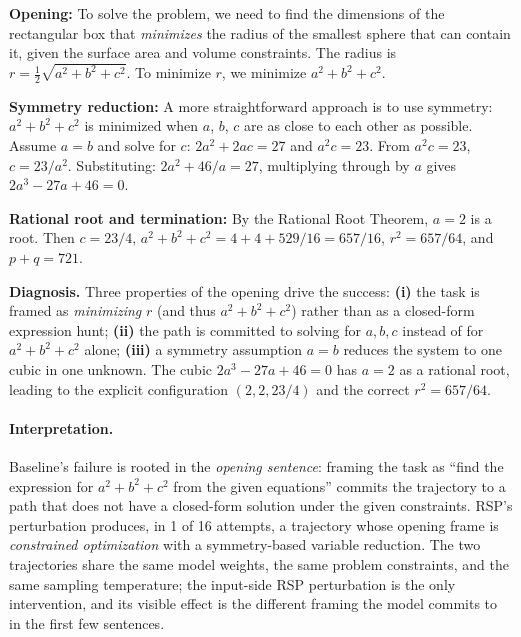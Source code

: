 \begin{tcolorbox}[colback=gray!5, colframe=black!60, arc=3pt, boxrule=0.5pt, fontupper=\footnotesize, breakable, title={RSP trajectory (final answer 721) --- excerpts}]
\textbf{Opening:} To solve the problem, we need to find the dimensions of the rectangular box that \emph{minimizes} the radius of the smallest sphere that can contain it, given the surface area and volume constraints. The radius is $r = \tfrac{1}{2}\sqrt{a^2 + b^2 + c^2}$. To minimize $r$, we minimize $a^2 + b^2 + c^2$.

\textbf{Symmetry reduction:} A more straightforward approach is to use symmetry: $a^2 + b^2 + c^2$ is minimized when $a$, $b$, $c$ are as close to each other as possible. Assume $a = b$ and solve for $c$: $2a^2 + 2ac = 27$ and $a^2 c = 23$. From $a^2 c = 23$, $c = 23/a^2$. Substituting: $2a^2 + 46/a = 27$, multiplying through by $a$ gives $2a^3 - 27a + 46 = 0$.

\textbf{Rational root and termination:} By the Rational Root Theorem, $a = 2$ is a root. Then $c = 23/4$, $a^2 + b^2 + c^2 = 4 + 4 + 529/16 = 657/16$, $r^2 = 657/64$, and $p + q = \boxed{721}$.
\end{tcolorbox}

\textbf{Diagnosis.} Three properties of the opening drive the success: \textbf{(i)} the task is framed as \emph{minimizing} $r$ (and thus $a^2+b^2+c^2$) rather than as a closed-form expression hunt; \textbf{(ii)} the path is committed to solving for $a, b, c$ instead of for $a^2+b^2+c^2$ alone; \textbf{(iii)} a symmetry assumption $a = b$ reduces the system to one cubic in one unknown. The cubic $2a^3 - 27a + 46 = 0$ has $a = 2$ as a rational root, leading to the explicit configuration $(2, 2, 23/4)$ and the correct $r^2 = 657/64$.

\paragraph{Interpretation.} Baseline's failure is rooted in the \emph{opening sentence}: framing the task as ``find the expression for $a^2+b^2+c^2$ from the given equations'' commits the trajectory to a path that does not have a closed-form solution under the given constraints. RSP's perturbation produces, in 1 of 16 attempts, a trajectory whose opening frame is \emph{constrained optimization} with a symmetry-based variable reduction. The two trajectories share the same model weights, the same problem constraints, and the same sampling temperature; the input-side RSP perturbation is the only intervention, and its visible effect is the different framing the model commits to in the first few sentences.

